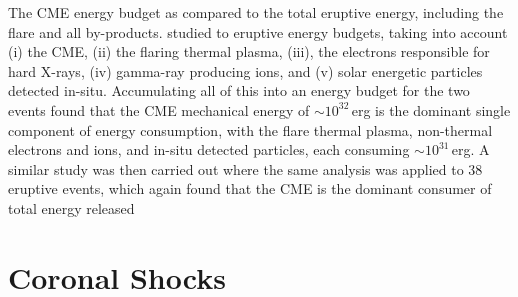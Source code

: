 The CME energy budget as compared to the total eruptive energy, including the flare and all by-products. \citet{emslie2004} studied to eruptive energy budgets, taking into account (i) the CME, (ii) the flaring thermal plasma, (iii), the electrons responsible for hard X-rays, (iv) gamma-ray producing ions, and (v) solar energetic particles detected in-situ. Accumulating all of this into an energy budget for the two events found that the CME mechanical energy of $\sim10^{32}$\,erg is the dominant single component of energy consumption, with the flare thermal plasma, non-thermal electrons and ions, and in-situ detected particles, each consuming $\sim10^{31}$\,erg. A similar study was then carried out where the same analysis was applied to 38 eruptive events, which again found that the CME is the dominant consumer of total energy released \citep{emslie2012}




\section{Coronal Shocks}\label{sec:21}

